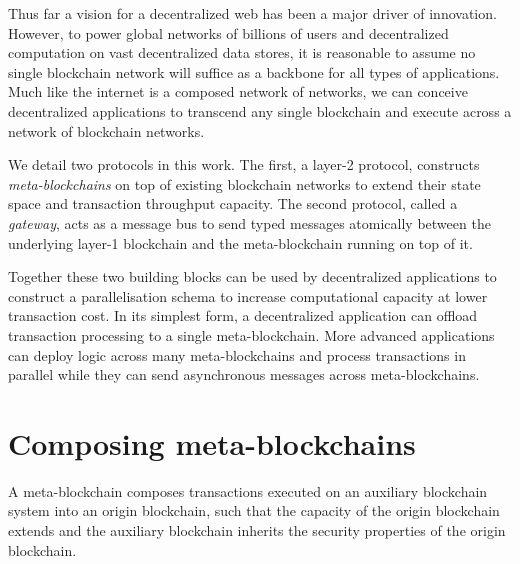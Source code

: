 \documentclass[12pt,a4paper]{article}
\begin{document}


Thus far a vision for a decentralized web has been a major driver of innovation.
However, to power global networks of billions of users and decentralized computation on vast decentralized data stores, it is reasonable to assume no single blockchain network will suffice as a backbone for all types of applications.
Much like the internet is a composed network of networks, we can conceive decentralized applications to transcend any single blockchain and execute across a network of blockchain networks.

We detail two protocols in this work.
The first, a layer-2 protocol, constructs \emph{meta-blockchains} on top of existing blockchain networks to extend their state space and transaction throughput capacity.
The second protocol, called a \emph{gateway}, acts as a message bus to send typed messages atomically between the underlying layer-1 blockchain and the meta-blockchain running on top of it.

Together these two building blocks can be used by decentralized applications to construct a parallelisation schema to increase %
computational capacity at lower transaction cost.
In its simplest form, a decentralized application can offload transaction processing to a single meta-blockchain.
More advanced applications can deploy logic across many meta-blockchains and process transactions in parallel while they can send asynchronous messages across meta-blockchains.


\section{Composing meta-blockchains}

A meta-blockchain composes transactions executed on an auxiliary blockchain system into an origin blockchain, such that the capacity of the origin blockchain extends and the auxiliary blockchain inherits the security properties of the origin blockchain.
\end{document}
